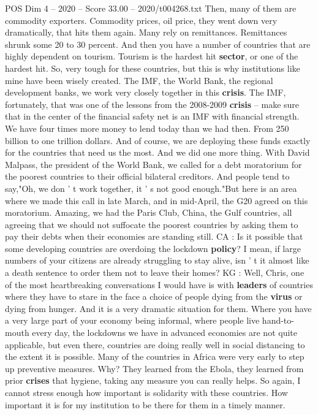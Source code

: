 \begin{textsample}{POS Dim 4 – 2020 – Score 33.00 – 2020/t004268.txt}
Then, many of them are commodity exporters.
Commodity prices, oil price, they went down very dramatically, that hits them again.
Many rely on remittances.
Remittances shrunk some 20 to 30 percent.
And then you have a number of countries that are highly dependent on tourism.
Tourism is the hardest hit \textbf{sector}, or one of the hardest hit.
So, very tough for these countries, but this is why institutions like mine have been wisely created.
The IMF, the World Bank, the regional development banks, we work very closely together in this \textbf{crisis}.
The IMF, fortunately, that was one of the lessons from the 2008-2009 \textbf{crisis} -- make sure that in the center of the financial safety net is an IMF with financial strength.
We have four times more money to lend today than we had then.
From 250 billion to one trillion dollars.
And of course, we are deploying these funds exactly for the countries that need us the most.
And we did one more thing.
With David Malpass, the president of the World Bank, we called for a debt moratorium for the poorest countries to their official bilateral creditors.
And people tend to say,"Oh, we don ' t work together, it ' s not good enough."But here is an area where we made this call in late March, and in mid-April, the G20 agreed on this moratorium.
Amazing, we had the Paris Club, China, the Gulf countries, all agreeing that we should not suffocate the poorest countries by asking them to pay their debts when their economies are standing still.
CA : Is it possible that some developing countries are overdoing the lockdown \textbf{policy}?
I mean, if large numbers of your citizens are already struggling to stay alive, isn ' t it almost like a death sentence to order them not to leave their homes?
KG : Well, Chris, one of the most heartbreaking conversations I would have is with \textbf{leaders} of countries where they have to stare in the face a choice of people dying from the \textbf{virus} or dying from hunger.
And it is a very dramatic situation for them.
Where you have a very large part of your economy being informal, where people live hand-to-mouth every day, the lockdowns we have in advanced economies are not quite applicable, but even there, countries are doing really well in social distancing to the extent it is possible.
Many of the countries in Africa were very early to step up preventive measures.
Why?
They learned from the Ebola, they learned from prior \textbf{crises} that hygiene, taking any measure you can really helps.
So again, I cannot stress enough how important is solidarity with these countries.
How important it is for my institution to be there for them in a timely manner.

\end{textsample}
